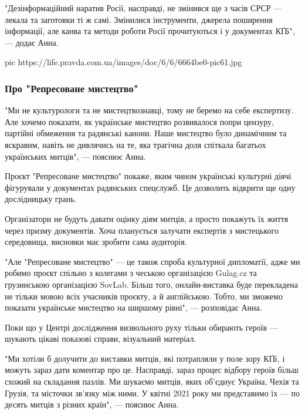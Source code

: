 "Дезінформаційний наратив Росії, насправді, не змінився ще з часів СРСР —
лекала та заготовки ті ж самі. Змінилися інструменти, джерела поширення
інформації, але канва та методи роботи Росії прочитуються і у документах КҐБ",
--- додає Анна.

\ifcmt
pic https://life.pravda.com.ua/images/doc/6/6/6664be0-pic61.jpg
\fi

\subsubsection{Про "Репресоване мистецтво"}
\label{sec:27_10_2020.news.ua.pravda.1.kgb_kultura}

"Ми не культурологи та не мистецтвознавці, тому не беремо на себе експертизу.
Але хочемо показати, як українське мистецтво розвивалося попри цензуру,
партійні обмеження та радянські канони. Наше мистецтво було динамічним та
яскравим, навіть не дивлячись на те, яка трагічна доля спіткала багатьох
українських митців", --- пояснює Анна.

Проєкт "Репресоване мистецтво" покаже, яким чином українські культурні діячі
фігурували у документах радянських спецслужб. Це дозволить відкрити ще одну
дослідницьку грань.

Організатори не будуть давати оцінку діям митців, а просто покажуть їх життя
через призму документів. Хоча планується залучати експертів з мистецького
середовища, висновки має зробити сама аудиторія.

"Але "Репресоване мистецтво" --- це також спроба культурної дипломатії, адже ми
робимо проєкт спільно з колегами з чеською організацією Gulag.cz та грузинською
організацією SovLab. Більш того, онлайн-виставка буде перекладена не тільки
мовою всіх учасників проєкту, а й англійською. Тобто, ми зможемо показати
українське мистецтво на ширшому рівні", --- розповідає Анна.

Поки що у Центрі дослідження визвольного руху тільки обирають героїв --- шукають
цікаві показові справи, візуальний матеріал. 

"Ми хотіли б долучити до виставки митців, які потрапляли у поле зору КҐБ, і
можуть зараз дати коментар про це. Насправді, зараз процес відбору героїв більш
схожий на складання пазлів. Ми шукаємо митців, яких об'єднує Україна, Чехія та
Грузія, та місточки зв'язку між ними. У квітні 2021 року ми представимо їх --- по
десять митців з різних країн", --- пояснює Анна.

